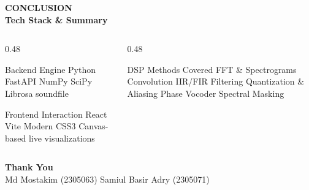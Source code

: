 \documentclass[aspectratio=169]{beamer}
\newcommand{\ModuleTitle}[2]{%
  {\scriptsize\color{textMuted}\bfseries\sffamily #1}\\[0.15em]
  {\Large\bfseries\color{goldAccent} #2}\\[0.4em]
}
\begin{document}
\begin{frame}
  \ModuleTitle{CONCLUSION}{Tech Stack \& Summary}
  \begin{columns}[T]
    \begin{column}{0.48\linewidth}
      \begin{block}{Backend Engine}
        \small Python \textbullet\; FastAPI \textbullet\; NumPy \textbullet\; SciPy \textbullet\; Librosa \textbullet\; soundfile
      \end{block}
      \vspace{0.4em}
      \begin{block}{Frontend Interaction}
        \small React \textbullet\; Vite \textbullet\; Modern CSS3 \textbullet\; Canvas-based live visualizations
      \end{block}
    \end{column}
    \begin{column}{0.48\linewidth}
      \begin{block}{DSP Methods Covered}
        \small FFT \& Spectrograms \textbullet\; Convolution \textbullet\; IIR/FIR Filtering \textbullet\; Quantization \& Aliasing \textbullet\; Phase Vocoder \textbullet\; Spectral Masking
      \end{block}
    \end{column}
  \end{columns}
  \vspace{1.2em}
  \centering
  {\large\color{goldAccent}\bfseries Thank You}\\[0.3em]
  {\small\color{textMuted} Md Mostakim (2305063) \quad\textbullet\quad Samiul Basir Adry (2305071)}
\end{frame}
\end{document}
